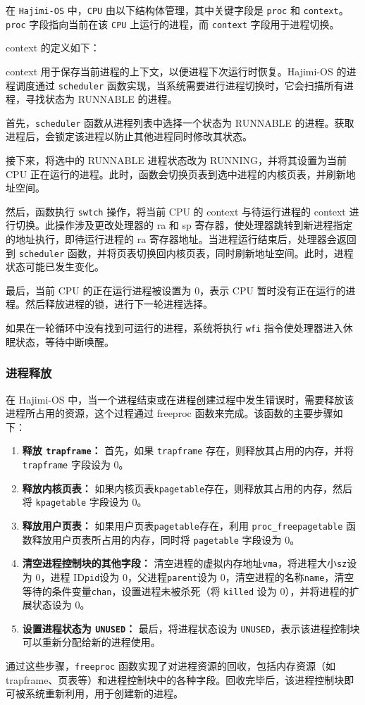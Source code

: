 \documentclass[UTF8]{article}
\begin{document}
在 \texttt{Hajimi-OS} 中，\texttt{CPU} 由以下结构体管理，其中关键字段是 \texttt{proc} 和 \texttt{context}。\texttt{proc} 字段指向当前在该 \texttt{CPU} 上运行的进程，而 \texttt{context} 字段用于进程切换。

context 的定义如下：

context 用于保存当前进程的上下文，以便进程下次运行时恢复。Hajimi-OS 的进程调度通过 \texttt{scheduler} 函数实现，当系统需要进行进程切换时，它会扫描所有进程，寻找状态为 RUNNABLE 的进程。

首先，\texttt{scheduler} 函数从进程列表中选择一个状态为 RUNNABLE 的进程。获取进程后，会锁定该进程以防止其他进程同时修改其状态。

接下来，将选中的 RUNNABLE 进程状态改为 RUNNING，并将其设置为当前 CPU 正在运行的进程。此时，函数会切换页表到选中进程的内核页表，并刷新地址空间。

然后，函数执行 \texttt{swtch} 操作，将当前 CPU 的 context 与待运行进程的 context 进行切换。此操作涉及更改处理器的 ra 和 sp 寄存器，使处理器跳转到新进程指定的地址执行，即待运行进程的 ra 寄存器地址。当进程运行结束后，处理器会返回到 \texttt{scheduler} 函数，并将页表切换回内核页表，同时刷新地址空间。此时，进程状态可能已发生变化。

最后，当前 CPU 的正在运行进程被设置为 0，表示 CPU 暂时没有正在运行的进程。然后释放进程的锁，进行下一轮进程选择。

如果在一轮循环中没有找到可运行的进程，系统将执行 \texttt{wfi} 指令使处理器进入休眠状态，等待中断唤醒。

\subsubsection{进程释放}
在 Hajimi-OS 中，当一个进程结束或在进程创建过程中发生错误时，需要释放该进程所占用的资源，这个过程通过 freeproc 函数来完成。该函数的主要步骤如下：
\begin{enumerate}[label=\textbf{\arabic*}., wide, labelwidth=!, labelindent=0pt]
  \item \textbf{释放 \texttt{trapframe}：} 首先，如果 \texttt{trapframe} 存在，则释放其占用的内存，并将 \texttt{trapframe} 字段设为 0。
  \item \textbf{释放内核页表：} 如果内核页表\texttt{kpagetable}存在，则释放其占用的内存，然后将 \texttt{kpagetable} 字段设为 0。
  \item \textbf{释放用户页表：} 如果用户页表\texttt{pagetable}存在，利用 \texttt{proc\_freepagetable} 函数释放用户页表所占用的内存，同时将 \texttt{pagetable} 字段设为 0。
  \item \textbf{清空进程控制块的其他字段：} 清空进程的虚拟内存地址\texttt{vma}，将进程大小\texttt{sz}设为 0，进程 ID\texttt{pid}设为 0，父进程\texttt{parent}设为 0，清空进程的名称\texttt{name}，清空等待的条件变量\texttt{chan}，设置进程未被杀死（将 \texttt{killed} 设为 0），并将进程的扩展状态设为 0。
  \item \textbf{设置进程状态为 \texttt{UNUSED}：} 最后，将进程状态设为 \texttt{UNUSED}，表示该进程控制块可以重新分配给新的进程使用。
\end{enumerate}
通过这些步骤，\texttt{freeproc} 函数实现了对进程资源的回收，包括内存资源（如 trapframe、页表等）和进程控制块中的各种字段。回收完毕后，该进程控制块即可被系统重新利用，用于创建新的进程。
\end{document}
